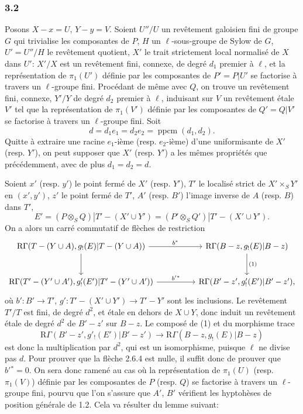 \subsubsection*{3.2}
Posons $X-x=U$, $Y-y=V$. Soient $U''/U$ un revêtement galoisien fini de groupe $G$ qui trivialise les composantes de $P$, $H$ un $\ell$-sous-groupe de Sylow de $G$, $U'=U''/H$ le revêtement quotient, $X'$ le trait strictement local normalisé de $X$ dans $U'$: $X'/X$ est un revêtement fini, connexe, de degré $d_1$ premier à $\ell$, et la représentation de $\pi_1(U')$ définie par les composantes de $P'=P|U'$ se factorise à travers un $\ell$-groupe fini. Procédant de même avec $Q$, on trouve un revêtement fini, connexe, $Y'/Y$ de degré $d_2$ premier à $\ell$, induisant sur $V$ un revêtement étale $V'$ tel que la représentation de $\pi_1(V')$ définie par les composantes de $Q'=Q|V'$ se factorise à travers un $\ell$-groupe fini. Soit
\[
d=d_1e_1=d_2e_2=\operatorname{ppcm}(d_1,d_2).
\]
Quitte à extraire une racine $e_1$-ième (resp. $e_2$-ième) d'une uniformisante de $X'$ (resp. $Y'$), on peut supposer que $X'$ (resp. $Y'$) a les mêmes propriétés que précédemment, avec de plus $d_1=d_2=d$.

Soient $x'$ (resp. $y'$) le point fermé de $X'$ (resp. $Y'$), $T'$ le localisé strict de $X'\times_S Y'$ en $(x',y')$, $z'$ le point fermé de $T'$, $A'$ (resp. $B'$) l'image inverse de $A$ (resp. $B$) dans $T'$,
\[
E'=(P\otimes_S Q)|T'-(X'\cup Y')
   =(P'\otimes_S Q')|T'-(X'\cup Y').
\]
On a alors un carré commutatif de flèches de restriction
\[
\begin{tikzcd}[column sep=huge,row sep=large]
\mathrm{R}\Gamma(T-(Y\cup A),g_!(E)|T-(Y\cup A))
 \arrow[r,"b^*"] \arrow[d]
&
\mathrm{R}\Gamma(B-z,g_!(E)|B-z) \arrow[d,"(1)"]\\
\mathrm{R}\Gamma(T'-(Y'\cup A'),g'_!(E')|T'-(Y'\cup A'))
 \arrow[r,"b'{}^*"]
&
\mathrm{R}\Gamma(B'-z',g'_!(E')|B'-z') ,
\end{tikzcd}
\]
où $b':B'\to T'$, $g':T'-(X'\cup Y')\to T'-Y'$
sont les inclusions. Le revêtement $T'/T$ est fini, de degré $d^2$, et étale en dehors de $X\cup Y$, donc induit un revêtement étale de degré $d^2$ de $B'-z'$ sur $B-z$. Le composé de (1) et du morphisme trace
\[
\mathrm{R}\Gamma(B'-z',g'_!(E')|B'-z')
 \longrightarrow
\mathrm{R}\Gamma(B-z,g_!(E)|B-z)
\]
est donc la multiplication par $d^2$, qui est un isomorphisme, puisque $\ell$ ne divise pas $d$. Pour prouver que la flèche 2.6.4 est nulle, il suffit donc de prouver que $b'{}^*=0$. On sera donc ramené au cas où la représentation de $\pi_1(U)$ (resp. $\pi_1(V)$) définie par les composantes de $P$ (resp. $Q$) se factorise à travers un $\ell$-groupe fini, pourvu que l'on s'assure que $A'$, $B'$ vérifient les hyptohèses de position générale de 1.2. Cela va résulter du lemme suivant:

